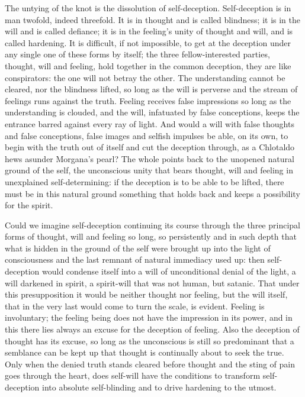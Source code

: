 \documentclass[12pt,a4paper,openany]{book}
\newcommand{\opage}[1]{\marginnote{\footnotesize\textit{[#1]}}}
\begin{document}
The untying of the knot is the dissolution of self-deception. Self-deception
is in man twofold, indeed threefold. It is in
thought and is called blindness; it is in the will and is called
defiance; it is in the feeling's unity of thought and will, and
is called hardening. It is difficult, if not impossible,
to get at the deception under any single one of these
forms by itself; the three fellow-interested parties, thought, will and
feeling, hold together in the common deception, they are like
conspirators: the one will not betray the other.
The understanding cannot be cleared, nor the blindness lifted,
\setcounter{footnote}{0}%
\opage{57}so long as the will is perverse and the stream of feelings runs
against the truth. Feeling receives false impressions so long as
the understanding is clouded, and the will, infatuated by false conceptions,
keeps the entrance barred against every ray of light.
And would a will with false thoughts and
false conceptions, false images and selfish impulses
be able, on its own, to begin with the truth
out of itself and cut the deception through, as a
Chlotaldo hews asunder Morgana's pearl? The whole points
back to the unopened natural ground of the self, the unconscious unity
that bears thought, will and feeling in unexplained self-determining:
if the deception is to be able to be lifted, there must be in
this natural ground something that holds back and
keeps a possibility for the spirit.

Could we imagine self-deception continuing its course
through the three principal forms of thought, will and feeling
so long, so persistently and in such depth that
what is hidden in the ground of the self were brought up into the light of consciousness
and the last remnant of natural immediacy used up:
then self-deception would condense itself into a will of unconditional %
denial of the light, a will darkened in spirit, a spirit-will
that was not human, but satanic. That under
this presupposition it would be neither thought nor feeling,
but the will itself, that in the very last would come to turn
the scale, is evident. Feeling is involuntary; the
feeling being does not have the impression in its power, and in this
there lies always an excuse for the deception of feeling. Also
the deception of thought has its excuse, so long as the unconscious
is still so predominant that a semblance can be kept up
that thought is continually about to seek
the true. Only when the denied truth stands
cleared before thought and the sting of pain goes through the heart,
does self-will have the conditions to transform self-deception
into absolute self-blinding and to drive hardening to the
utmost.
\end{document}
